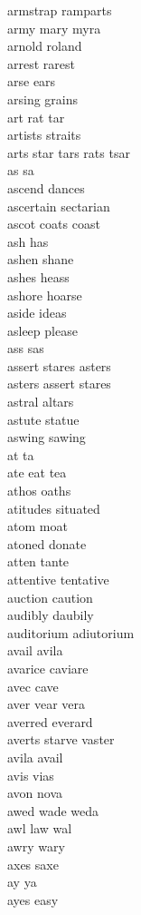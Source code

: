 armstrap ramparts\\
army mary myra\\
arnold roland\\
arrest rarest\\
arse ears\\
arsing grains\\
art rat tar\\
artists straits\\
arts star tars rats tsar\\
as sa\\
ascend dances\\
ascertain sectarian\\
ascot coats coast\\
ash has\\
ashen shane\\
ashes heass\\
ashore hoarse\\
aside ideas\\
asleep please\\
ass sas\\
assert stares asters\\
asters assert stares\\
astral altars\\
astute statue\\
aswing sawing\\
at ta\\
ate eat tea\\
athos oaths\\
atitudes situated\\
atom moat\\
atoned donate\\
atten tante\\
attentive tentative\\
auction caution\\
audibly daubily\\
auditorium adiutorium\\
avail avila\\
avarice caviare\\
avec cave\\
aver vear vera\\
averred everard\\
averts starve vaster\\
avila avail\\
avis vias\\
avon nova\\
awed wade weda\\
awl law wal\\
awry wary\\
axes saxe\\
ay ya\\
ayes easy\\

